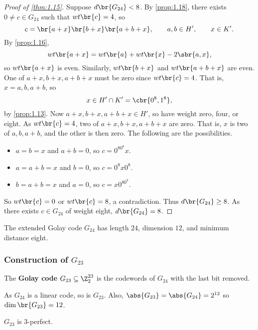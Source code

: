 \begin{proof}[Proof of \ref{thm:1.15}]
Suppose $ d\br{G_{24}} < 8 $. By \ref{prop:1.18}, there exists $ 0 \ne c \in G_{24} $ such that $ wt\br{c} = 4 $, so
$$ c = \br{a + x}\br{b + x}\br{a + b + x}, \qquad a, b \in H', \qquad x \in K'. $$
By \ref{prop:1.16},
$$ wt\br{a + x} = wt\br{a} + wt\br{x} - 2\sbr{a, x}, $$
so $ wt\br{a + x} $ is even. Similarly, $ wt\br{b + x} $ and $ wt\br{a + b + x} $ are even. One of $ a + x, b + x, a + b + x $ must be zero since $ wt\br{c} = 4 $. That is, $ x = a, b, a + b $, so
$$ x \in H' \cap K' = \cbr{0^8, 1^8}, $$
by \ref{prop:1.13}. Now $ a + x, b + x, a + b + x \in H' $, so have weight zero, four, or eight. As $ wt\br{c} = 4 $, two of $ a + x, b + x, a + b + x $ are zero. That is, $ x $ is two of $ a, b, a + b $, and the other is then zero. The following are the possibilities.
\begin{itemize}
\item $ a = b = x $ and $ a + b = 0 $, so $ c = 0^80^8x $.
\item $ a = a + b = x $ and $ b = 0 $, so $ c = 0^8x0^8 $.
\item $ b = a + b = x $ and $ a = 0 $, so $ c = x0^80^8 $.
\end{itemize}
So $ wt\br{c} = 0 $ or $ wt\br{c} = 8 $, a contradiction. Thus $ d\br{G_{24}} \ge 8 $. As there exists $ c \in G_{24} $ of weight eight, $ d\br{G_{24}} = 8 $.
\end{proof}

\begin{theorem}
The extended Golay code $ G_{24} $ has length $ 24 $, dimension $ 12 $, and minimum distance eight.
\end{theorem}

\pagebreak

\subsubsection{Construction of \texorpdfstring{$ G_{23} $}{G23}}

\begin{definition*}
The \textbf{Golay code} $ G_{23} \subseteq \Z_2^{23} $ is the codewords of $ G_{24} $ with the last bit removed.
\end{definition*}

As $ G_{24} $ is a linear code, so is $ G_{23} $. Also, $ \abs{G_{23}} = \abs{G_{24}} = 2^{12} $ so $ \dim\br{G_{23}} = 12 $.

\begin{theorem}
$ G_{23} $ is $ 3 $-perfect.
\end{theorem}

